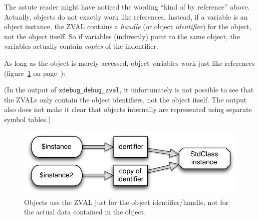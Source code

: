 The astute reader might have noticed the wording ``kind of by reference'' above. Actually, objects do not exactly work like references. Instead, if a variable is an object instance, the ZVAL contains a \emph{handle} (or object \emph{identifier}) for the object, not the object itself. So if variables (indirectly) point to the same object, the variables actually contain \emph{copies} of the indentifier.~\cite{php-manual-oop-references}

As long as the object is merely accessed, object variables work just like references (figure~\ref{fig:objects-as-references} on page~\pageref{fig:objects-as-references}):



(In the output of \texttt{xdebug\_debug\_zval}, it unfortunately is not possible to see that the ZVALs only contain the object identifiers, not the object itself. The output also does not make it clear that objects internally are represented using separate symbol tables.)

\begin{figure}[htb]
  \begin{center}
    \includegraphics[scale=0.8]{images/instance_instance2}
    \caption{Objects use the ZVAL just for the object identifier/handle, not for the actual data contained in the object.}
    \label{fig:objects-as-references}
  \end{center}
\end{figure}


